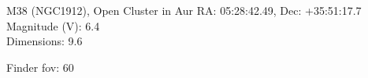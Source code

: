 \begin{block}{M38 (NGC1912), Open Cluster in Aur}
    RA: 05:28:42.49, Dec: +35:51:17.7 \\ 
    Magnitude (V): 6.4 \\ 
    Dimensions: 9.6 

    Finder fov: 60 
\end{block}